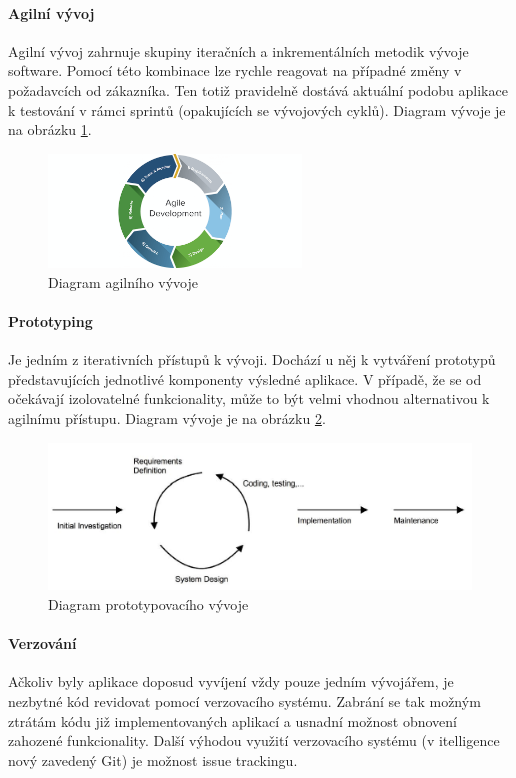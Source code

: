 \documentclass[thesis=M,czech]{FITthesis}[2012/06/26]
\begin{document}
\paragraph{Agilní vývoj}
Agilní vývoj zahrnuje skupiny iteračních a inkrementálních metodik vývoje software. Pomocí této kombinace lze rychle reagovat na případné změny v požadavcích od zákazníka. Ten totiž pravidelně dostává aktuální podobu aplikace k testování v rámci sprintů (opakujících se vývojových cyklů). Diagram vývoje je na obrázku \ref{img:agile}.
\begin{figure}[H]
	\centering
	\includegraphics[width=0.6\textwidth]{images/agile}
	\caption{Diagram agilního vývoje \cite{prototyping}}
	\label{img:agile}
\end{figure}

\paragraph{Prototyping}
Je jedním z iterativních přístupů k vývoji. Dochází u něj k vytváření prototypů představujících jednotlivé komponenty výsledné aplikace. V případě, že se od očekávají izolovatelné funkcionality, může to být velmi vhodnou alternativou k agilnímu přístupu. Diagram vývoje je na obrázku \ref{img:prototyping}.
\begin{figure}[H]
	\centering
	\includegraphics[width=1\textwidth]{images/prototyping}
	\caption{Diagram prototypovacího vývoje \cite{prototyping}}
	\label{img:prototyping}
\end{figure}

\paragraph{Verzování}
Ačkoliv byly aplikace doposud vyvíjení vždy pouze jedním vývojářem, je nezbytné kód revidovat pomocí verzovacího systému. Zabrání se tak možným ztrátám kódu již implementovaných aplikací a usnadní možnost obnovení zahozené funkcionality. Další výhodou využití verzovacího systému (v itelligence nový zavedený Git) je možnost issue trackingu.
\end{document}
